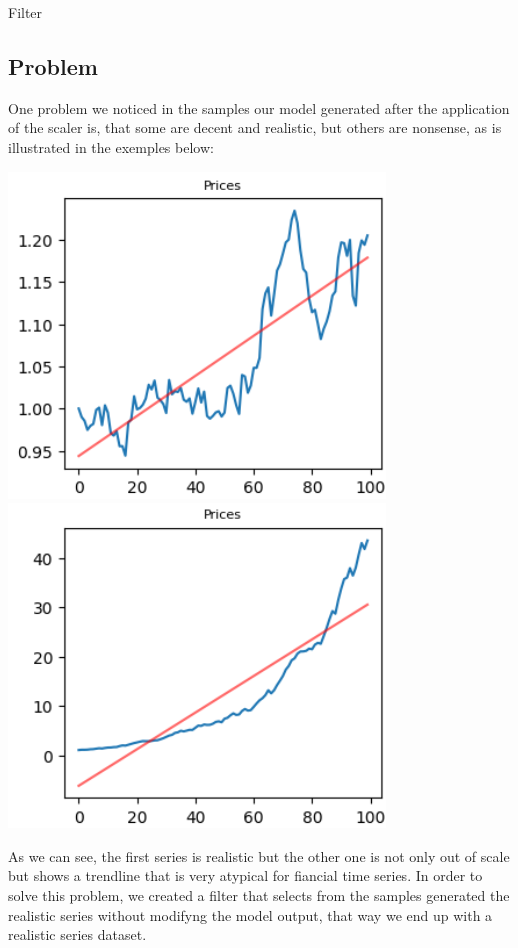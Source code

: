 \documentclass{article}
\begin{document}
    \vspace{0.3cm}
\begin{center}
    {\huge{Filter}}
\end{center}    
    \begin{multicols}{2}
    \section*{Problem}
    One problem we noticed in the samples our model generated after the application of the scaler is, that some are decent and realistic, but others are 
    nonsense, as is illustrated in the exemples below:
    \begin{center}
        \includegraphics[scale=0.49]{imgs/riccardo/serie_comp_1.png}
        \includegraphics[scale=0.49]{imgs/riccardo/serie_comp_2.png}
    \end{center}
    As we can see, the first series is realistic but the other one is not only out of scale but shows a trendline that is very 
    atypical for fiancial time series. In order to solve this problem, we created a filter that selects from the samples generated the realistic series without modifyng the model output, that way we end up with a realistic series dataset.

\end{multicols}
\end{document}
